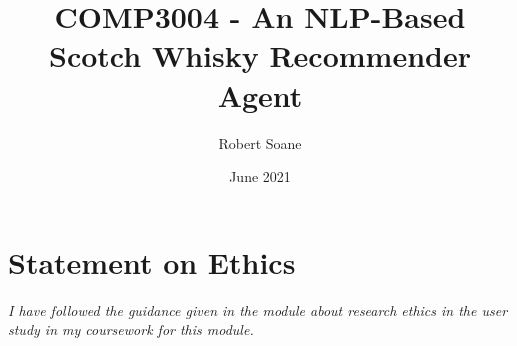 \documentclass[11pt, a4paper, oneside, notitlepage]{article}
\title{COMP3004 - An NLP-Based Scotch Whisky Recommender Agent}
\author{Robert Soane}
\date{June 2021}
\begin{document}
\maketitle

\tableofcontents
\newpage














\section{Statement on Ethics}\label{sec:StatementOnEthics}
\emph{I have followed the guidance given in the module about research ethics in the user study in my coursework for this module.}


\end{document}
